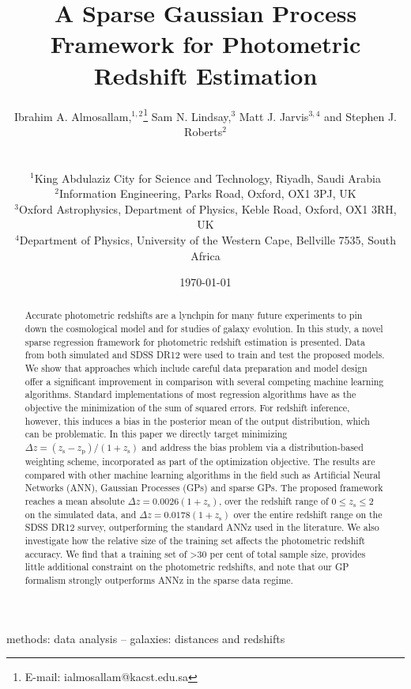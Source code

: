 \documentclass[useAMS,usenatbib,fleqn]{mn2e}
\title[A Sparse GP Framework for Photometric Redshift]{A Sparse Gaussian Process Framework for Photometric Redshift Estimation}
\author[Almosallam et al.]
{\parbox{\textwidth}{Ibrahim A. Almosallam,$^{1,2}$\thanks{E-mail: ialmosallam@kacst.edu.sa} Sam N. Lindsay,$^{3}$ Matt J. Jarvis$^{3,4}$ and Stephen J. Roberts$^{2}$
}
\vspace{0.4cm}\\
\parbox{\textwidth}{
$^1$King Abdulaziz City for Science and Technology, Riyadh, Saudi Arabia\\
$^2$Information Engineering, Parks Road, Oxford, OX1 3PJ, UK\\
$^3$Oxford Astrophysics, Department of Physics, Keble Road, Oxford, OX1 3RH, UK\\
$^4$Department of Physics, University of the Western Cape, Bellville 7535, South Africa\\
}}
\begin{document}
\date{\today}

\pagerange{\pageref{firstpage}--\pageref{lastpage}} 

\maketitle

\label{firstpage}

\begin{abstract}
Accurate photometric redshifts are a lynchpin for many future experiments to pin down the cosmological model and for studies of galaxy evolution. In this study, a novel sparse regression framework for photometric redshift estimation is presented. Data from both simulated and SDSS DR12 were used to train and test the proposed models. We show that approaches which include careful data preparation and model design offer a significant improvement in comparison with several competing machine learning algorithms. Standard implementations of most regression algorithms have as the objective the minimization of the sum of squared errors. For redshift inference, however, this induces a bias in the posterior mean of the output distribution, which can be problematic. In this paper we directly target minimizing $\Delta z = (z_\textrm{s} - z_\textrm{p})/(1+z_\textrm{s})$ and address the bias problem via a distribution-based weighting scheme, incorporated as part of the optimization objective. The results are compared with other machine learning algorithms in the field such as Artificial Neural Networks (ANN), Gaussian Processes (GPs) and sparse GPs. The proposed framework reaches a mean absolute $\Delta z = 0.0026(1+z_\textrm{s})$, over the redshift range of $0 \le z_\textrm{s} \le 2$ on the simulated data, and $\Delta z = 0.0178(1+z_\textrm{s})$ over the entire redshift range on the SDSS DR12 survey, outperforming the standard {\sc ANNz} used in the literature. We also investigate how the relative  size of the training set affects the photometric redshift accuracy. We find that a training set of \textgreater 30 per cent of total sample size, provides little additional constraint on the photometric redshifts, and note that our GP formalism strongly outperforms {\sc ANNz} in the sparse data regime.

\end{abstract}

\begin{keywords}
methods: data analysis -- galaxies: distances and redshifts
\end{keywords}
\end{document}
